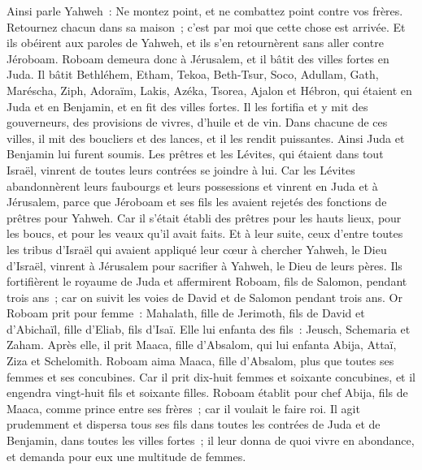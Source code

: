 \begin{multicols}{2}
Ainsi parle Yahweh~: Ne montez point, et ne combattez point contre vos frères. Retournez chacun dans sa maison~; c'est par moi que cette chose est arrivée. Et ils obéirent aux paroles de Yahweh, et ils s'en retournèrent sans aller contre Jéroboam.
Roboam demeura donc à Jérusalem, et il bâtit des villes fortes en Juda.
Il bâtit Bethléhem, Etham, Tekoa,
Beth-Tsur, Soco, Adullam,
Gath, Maréscha, Ziph,
Adoraïm, Lakis, Azéka,
Tsorea, Ajalon et Hébron, qui étaient en Juda et en Benjamin, et en fit des villes fortes.
Il les fortifia et y mit des gouverneurs, des provisions de vivres, d'huile et de vin.
Dans chacune de ces villes, il mit des boucliers et des lances, et il les rendit puissantes. Ainsi Juda et Benjamin lui furent soumis.
Les prêtres et les Lévites, qui étaient dans tout Israël, vinrent de toutes leurs contrées se joindre à lui.
Car les Lévites abandonnèrent leurs faubourgs et leurs possessions et vinrent en Juda et à Jérusalem, parce que Jéroboam et ses fils les avaient rejetés des fonctions de prêtres pour Yahweh.
Car il s'était établi des prêtres pour les hauts lieux, pour les boucs, et pour les veaux qu'il avait faits.
Et à leur suite, ceux d'entre toutes les tribus d'Israël qui avaient appliqué leur cœur à chercher Yahweh, le Dieu d'Israël, vinrent à Jérusalem pour sacrifier à Yahweh, le Dieu de leurs pères.
Ils fortifièrent le royaume de Juda et affermirent Roboam, fils de Salomon, pendant trois ans~; car on suivit les voies de David et de Salomon pendant trois ans.
Or Roboam prit pour femme~: Mahalath, fille de Jerimoth, fils de David et d'Abichaïl, fille d'Eliab, fils d'Isaï.
Elle lui enfanta des fils~: Jeusch, Schemaria et Zaham.
Après elle, il prit Maaca, fille d'Absalom, qui lui enfanta Abija, Attaï, Ziza et Schelomith.
Roboam aima Maaca, fille d'Absalom, plus que toutes ses femmes et ses concubines. Car il prit dix-huit femmes et soixante concubines, et il engendra vingt-huit fils et soixante filles.
Roboam établit pour chef Abija, fils de Maaca, comme prince entre ses frères~; car il voulait le faire roi.
Il agit prudemment et dispersa tous ses fils dans toutes les contrées de Juda et de Benjamin, dans toutes les villes fortes~; il leur donna de quoi vivre en abondance, et demanda pour eux une multitude de femmes.

\end{multicols}
